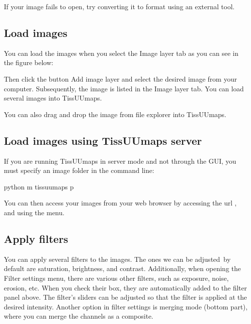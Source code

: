 \documentclass[letterpaper,10pt,english,openany,oneside]{sphinxmanual}
\begin{document}
\sphinxAtStartPar
If your image fails to open, try converting it to  format using an external tool.


\subsection{Load images}
\label{\detokenize{docs/starting/images:load-images}}
\sphinxAtStartPar
You can load the images when you select the Image layer tab as you can see in the figure below:

\sphinxAtStartPar
Then click the button Add image layer and select the desired image from your computer. Subsequently, the image is listed in the Image layer tab. You can load several images into TissUUmaps.

\sphinxAtStartPar
You can also drag and drop the image from file explorer into TissUUmaps.


\subsection{Load images using TissUUmaps server}
\label{\detokenize{docs/starting/images:load-images-using-tissuumaps-server}}
\sphinxAtStartPar
If you are running TissUUmaps in server mode and not through the GUI, you must specify an image folder in the command line:

\begin{sphinxVerbatim}[commandchars=\\\{\}]
python \PYGZhy{}m tissuumaps  \PYGZhy{}p 
\end{sphinxVerbatim}

\sphinxAtStartPar
You can then access your images from your web browser by accessing the url , and using the  menu.

\sphinxAtStartPar
{}

\sphinxAtStartPar
{}


\subsection{Apply filters}
\label{\detokenize{docs/starting/images:apply-filters}}
\sphinxAtStartPar
You can apply several filters to the images. The ones we can be adjusted by default are saturation, brightness, and contrast. Additionally, when opening the Filter settings menu, there are various other filters, such as exposure, noise, erosion, etc. When you check their box, they are automatically added to the filter panel above. The filter’s sliders can be adjusted so that the filter is applied at the desired intensity. Another option in filter settings is merging mode (bottom part), where you can merge the channels as a composite.
\end{document}
